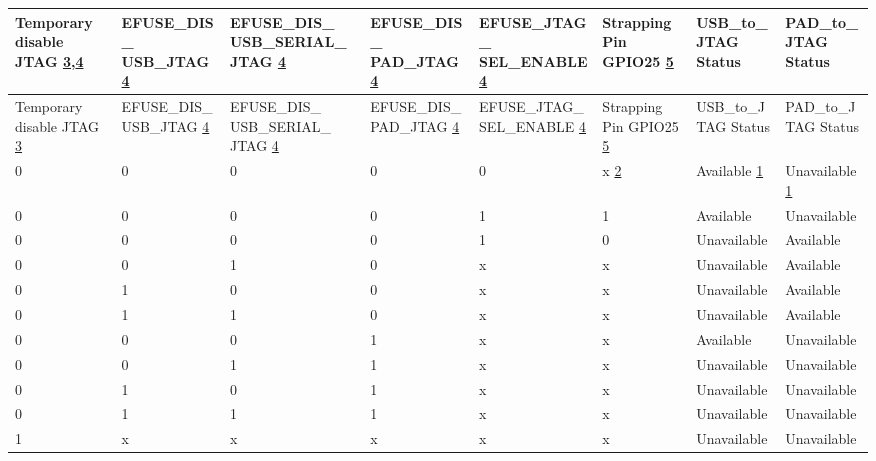 
\begin{longtable}{ | p{1.4cm} | p{1.9cm} | p{2.1cm} | p{1.9cm} | p{2.1cm} | p{1.4cm} | p{2.1cm} | p{2.1cm} | }
\hline\rowcolor{lightgray}
Temporary disable JTAG \hyperref[JTAG footnote: 3]{3},\hyperref[JTAG footnote: 4]{4} & EFUSE\_DIS\_ USB\_JTAG \hyperref[JTAG footnote: 4]{4} & EFUSE\_DIS\_ USB\_SERIAL\_ JTAG \hyperref[JTAG footnote: 4]{4} & EFUSE\_DIS\_ PAD\_JTAG \hyperref[JTAG footnote: 4]{4} & EFUSE\_JTAG\_ SEL\_ENABLE \hyperref[JTAG footnote: 4]{4} & Strapping Pin GPIO25 \hyperref[JTAG footnote: 5]{5} & USB\_to\_JTAG Status & PAD\_to\_JTAG Status \\ \hline
\endfirsthead
\hline
\rowcolor{lightgray}
Temporary disable JTAG \hyperref[JTAG footnote: 3]{3} & EFUSE\_DIS\_ USB\_JTAG \hyperref[JTAG footnote: 4]{4} & EFUSE\_DIS\_ USB\_SERIAL\_ JTAG \hyperref[JTAG footnote: 4]{4} & EFUSE\_DIS\_ PAD\_JTAG \hyperref[JTAG footnote: 4]{4} & EFUSE\_JTAG\_ SEL\_ENABLE \hyperref[JTAG footnote: 4]{4} & Strapping Pin GPIO25  \hyperref[JTAG footnote: 5]{5} & USB\_to\_JTAG Status & PAD\_to\_JTAG Status \\ \hline
\hline
\endhead
\endfoot

0 & 0 & 0 & 0 & 0 & x \hyperref[JTAG footnote: 2]{2}	& Available	 \hyperref[JTAG footnote: 1]{1}  &     Unavailable  \hyperref[JTAG footnote: 1]{1}  \\\hline
0 & 0 & 0 & 0 & 1 & 1	& Available	  &     Unavailable   \\\hline
0 & 0 & 0 & 0 & 1 & 0	& Unavailable & 	Available \\\hline
0 & 0 & 1 & 0 & x & x	& Unavailable & 	Available \\\hline
0 & 1 & 0 & 0 & x & x	& Unavailable & 	Available \\\hline
0 & 1 & 1 & 0 & x & x	& Unavailable & 	Available \\\hline
0 & 0 & 0 & 1 & x & x	& Available	  &     Unavailable \\\hline
0 & 0 & 1 & 1 & x & x	& Unavailable & 	Unavailable \\\hline
0 & 1 & 0 & 1 & x & x	& Unavailable & 	Unavailable \\\hline
0 & 1 & 1 & 1 & x & x	& Unavailable & 	Unavailable \\\hline
1 & x & x & x & x & x	& Unavailable & 	Unavailable \\\hline

\end{longtable}


